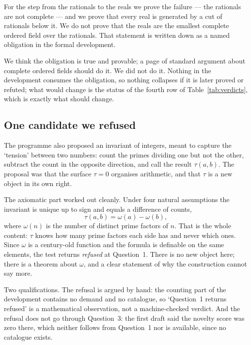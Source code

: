 \documentclass[12pt,a4paper]{article}
\begin{document}
For the step from the rationals to the reals we prove the failure --- the rationals
are not complete --- and we prove that every real is generated by a cut of
rationals below it.  We do not prove that the reals are the smallest complete
ordered field over the rationals.  That statement is written down as a named
obligation in the formal development.

We think the obligation is true and provable; a page of standard argument about
complete ordered fields should do it.  We did not do it.  Nothing in the
development consumes the obligation, so nothing collapses if it is later proved or
refuted; what would change is the status of the fourth row of
Table~\ref{tab:verdicts}, which is exactly what should change.

\subsection{One candidate we refused}

The programme also proposed an invariant of integers, meant to capture the
`tension' between two numbers: count the primes dividing one but not the other,
subtract the count in the opposite direction, and call the result $\tau(a,b)$.  The
proposal was that the surface $\tau=0$ organises arithmetic, and that $\tau$ is a
new object in its own right.

The axiomatic part worked out cleanly.  Under four natural assumptions the
invariant is unique up to sign and equals a difference of counts,
\begin{equation}
\tau(a,b) = \omega(a) - \omega(b),
\end{equation}
where $\omega(n)$ is the number of distinct prime factors of $n$.  That is the
whole content: $\tau$ knows how many prime factors each side has and never which
ones.  Since $\omega$ is a century-old function and the formula is definable on the
same elements, the test returns \emph{refused} at Question~1.  There is no new
object here; there is a theorem about $\omega$, and a clear statement of why the
construction cannot say more.

Two qualifications.  The refusal is argued by hand: the counting part of the
development contains no demand and no catalogue, so `Question~1 returns refused'
is a mathematical observation, not a machine-checked verdict.  And the refusal
does not go through Question~3: the first draft said the novelty score was zero
there, which neither follows from Question~1 nor is available, since no catalogue
exists.
\end{document}
